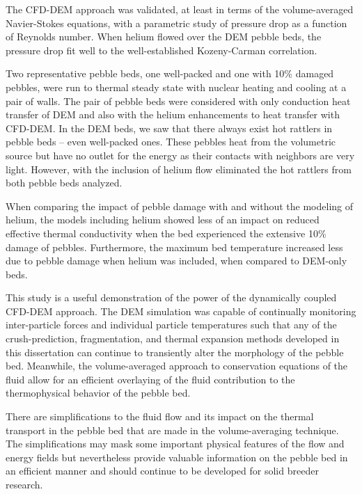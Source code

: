The CFD-DEM approach was validated, at least in terms of the volume-averaged Navier-Stokes equations, with a parametric study of pressure drop as a function of Reynolds number. When helium flowed over the DEM pebble beds, the pressure drop fit well to the well-established Kozeny-Carman correlation.

Two representative pebble beds, one well-packed and one with 10\% damaged pebbles, were run to thermal steady state with nuclear heating and cooling at a pair of walls.  The pair of pebble beds were considered with only conduction heat transfer of DEM and also with the helium enhancements to heat transfer with CFD-DEM. In the DEM beds, we saw that there always exist hot rattlers in pebble beds -- even well-packed ones. These pebbles heat from the volumetric source but have no outlet for the energy as their contacts with neighbors are very light. However, with the inclusion of helium flow eliminated the hot rattlers from both pebble beds analyzed.

When comparing the impact of pebble damage with and without the modeling of helium, the models including helium showed less of an impact on reduced effective thermal conductivity when the bed experienced the extensive 10\% damage of pebbles. Furthermore, the maximum bed temperature increased less due to pebble damage when helium was included, when compared to DEM-only beds.

This study is a useful demonstration of the power of the dynamically coupled CFD-DEM approach. The DEM simulation was capable of continually monitoring inter-particle forces and individual particle temperatures such that any of the crush-prediction, fragmentation, and thermal expansion methods developed in this dissertation can continue to transiently alter the morphology of the pebble bed. Meanwhile, the volume-averaged approach to conservation equations of the fluid allow for an efficient overlaying of the fluid contribution to the thermophysical behavior of the pebble bed.

There are simplifications to the fluid flow and its impact on the thermal transport in the pebble bed that are made in the volume-averaging technique. The simplifications may mask some important physical features of the flow and energy fields but nevertheless provide valuable information on the pebble bed in an efficient manner and should continue to be developed for solid breeder research.




